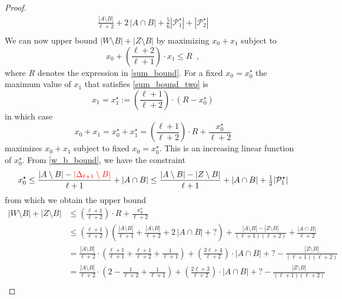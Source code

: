 \documentclass{patmorin}
\begin{document}
\begin{proof}
\begin{align}
    \frac{|A\setminus B|}{\ell+2} + 2\,|A\cap B| + \tfrac{5}{6}|\mathcal{P}_1^\star|+|\mathcal{P}_2^\star| \\
    \label{sum_bound}
  \end{align}
  We can now upper bound $|W\setminus B|+|Z\setminus B|$ by maximizing $x_0+x_1$ subject to
  \begin{equation}
     x_0+\left(\frac{\ell+2}{\ell+1}\right)\cdot x_1 \le R \enspace , \label{sum_bound_two}
  \end{equation}
  where $R$ denotes the expression in \eqref{sum_bound}.
  For a fixed $x_0=x^\star_0$ the maximum value of $x_1$ that satisfies \eqref{sum_bound_two} is
  \[
    x_1 = x_1^\star:=\left(\frac{\ell+1}{\ell+2}\right)\cdot(R-x^{\star}_0)
  \]
  in which case
  \[
     x_0 + x_1 = x^\star_0+x^\star_1 = \left(\frac{\ell+1}{\ell+2}\right)\cdot R + \frac{x^\star_0}{\ell+2}
  \]
  maximizes $x_0+x_1$ subject to fixed $x_0=x_0^{\star}$.
  This is an increasing linear function of $x_0^{\star}$.  From \eqref{w_b_bound}, we have the constraint
  \[
     x_0^\star \le
     \frac{|A\setminus B|-\mathcolor{red}{|\Delta_{\ell+1}\setminus B|}}{\ell+1}+|A\cap B|
     \le \frac{|A\setminus B|-|Z\setminus B|}{\ell+1}+|A\cap B|+\tfrac{1}{2}|\mathcal{P}_1^\star|
  \]
  from which we obtain the upper bound
  \begin{align*}
    |W\setminus B|+|Z\setminus B|
    & \le \left(\frac{\ell+1}{\ell+2}\right)\cdot R +
    \frac{x_0^\star}{\ell+2} \\
    & \le \left(\frac{\ell+1}{\ell+2}\right)\left(\frac{|A\setminus B|}{\ell+1}+\frac{|A\setminus B|}{\ell+2}+2\,|A\cap B|+{?}\right)+\frac{|A\setminus B|-|Z\setminus B|}{(\ell+1)
    (\ell+2)}
    + \frac{|A\cap B|}{\ell+2}
    \\
    & = \frac{|A\setminus B|}{\ell+2}\cdot\left(\frac{\ell+1}{\ell+1}+\frac{\ell+1}{\ell+2}+\frac{1}{\ell+1}\right) +\left(\frac{3\ell+4}{\ell+2}\right)\cdot |A\cap B| +{?} -\frac{|Z\setminus B|}{(\ell+1)(\ell+2)}  \\
    & = \frac{|A\setminus B|}{\ell+2}\cdot\left(2-\frac{1}{\ell+2}+\frac{1}{\ell+1}\right) +\left(\frac{2\ell+3}{\ell+2}\right)\cdot |A\cap B| +{?} -\frac{|Z\setminus B|}{(\ell+1)(\ell+2)}  \\

\end{align*}
\end{proof}
\end{document}
